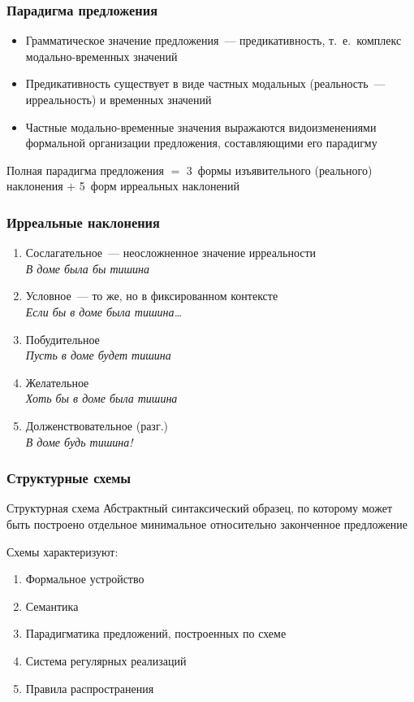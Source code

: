 \begin{frame}
  \frametitle{Парадигма предложения}

  \begin{itemize}
    \item Грамматическое значение предложения~--- предикативность, т.~е.\ комплекс модально-временных значений
    \item Предикативность существует в виде частных модальных (реальность~--- ирреальность) и временных значений
    \item Частные модально-временные значения выражаются видоизменениями формальной организации предложения, составляющими его парадигму
  \end{itemize}

  \vfill

  Полная парадигма предложения
  $=$ 3~формы изъявительного (реального) наклонения
  $+$ 5~форм ирреальных наклонений
\end{frame}

\begin{frame}
  \frametitle{Ирреальные наклонения}

  \begin{enumerate}
    \item Сослагательное~--- неосложненное значение ирреальности \\
      \textit{В доме была бы тишина}
    \item Условное~--- то же, но в фиксированном контексте \\
      \textit{Если бы в доме была тишина\ldots}
    \item Побудительное \\
      \textit{Пусть в доме будет тишина}
    \item Желательное \\
      \textit{Хоть бы в доме была тишина}
    \item Долженствовательное (разг.) \\
      \textit{В доме будь тишина!}
  \end{enumerate}
\end{frame}

\begin{frame}
  \frametitle{Структурные схемы}

  \begin{alertblock}{Структурная схема}
    Абстрактный синтаксический образец,
    по которому может быть построено отдельное минимальное относительно законченное предложение
  \end{alertblock}

  \vfill

  Схемы характеризуют:
  \begin{enumerate}
    \item Формальное устройство
    \item Семантика
    \item Парадигматика предложений, построенных по схеме
    \item Система регулярных реализаций
    \item Правила распространения
  \end{enumerate}
\end{frame}

